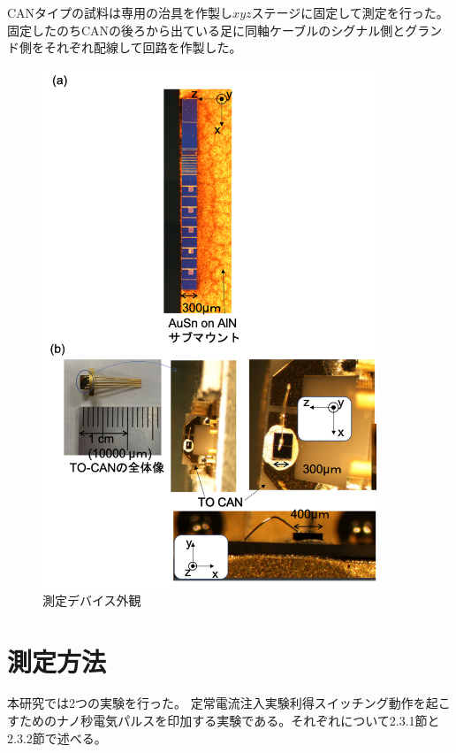 CANタイプの試料は専用の治具を作製し$xyz$ステージに固定して測定を行った。固定したのちCANの後ろから出ている足に同軸ケーブルのシグナル側とグランド側をそれぞれ配線して回路を作製した。

\begin{figure}[h]%
	\centering
	\includegraphics[width=10cm]{figure/fig_2_1_mount.png}
	\caption{測定デバイス外観}
	\label{fig:fig_2_1_mount}
\end{figure}

\clearpage
\section{測定方法}%
本研究では2つの実験を行った。
定常電流注入実験利得スイッチング動作を起こすためのナノ秒電気パルスを印加する実験である。それぞれについて2.3.1節と2.3.2節で述べる。
